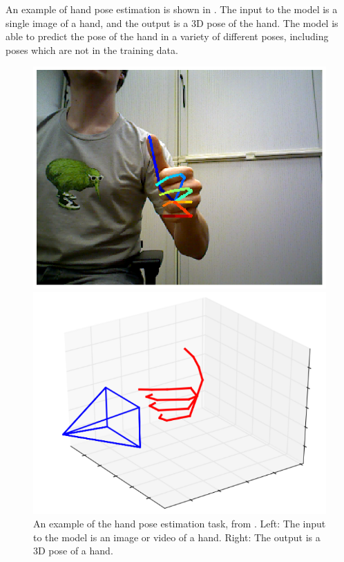 An example of hand pose estimation is shown in . The input to the model is a single image of a hand, and the output is a 3D pose of the hand. The model is able to predict the pose of the hand in a variety of different poses, including poses which are not in the training data.

\begin{figure}
    \begin{minipage}{0.48\linewidth}
        \includegraphics[width=\linewidth]{figures/hand-pose-1.png}
    \end{minipage}
    \hfill
    \begin{minipage}{0.48\linewidth}
        \includegraphics[width=\linewidth]{figures/hand-pose-2.png}
    \end{minipage}
    \captionsetup{parskip=7pt}
    \caption[Hand pose estimation]{An example of the hand pose estimation task, from \cite{hand-pose-survey}. Left: The input to the model is an image or video of a hand. Right: The output is a 3D pose of a hand.}
    \hrulefill
    \label{fig:pose-estimation}
\end{figure}


